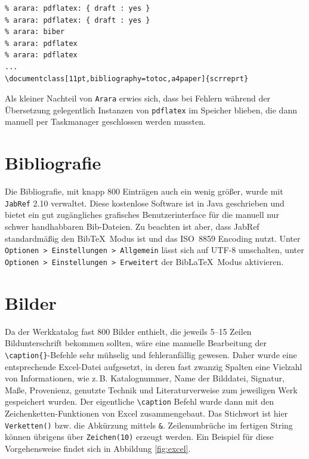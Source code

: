 \documentclass[12pt,ngerman]{dtk}
\begin{document}
\begin{lstlisting}[caption={Arara-Kopf für die Steuerung des \LaTeX\ Laufs},label={lis:arara}]
%!TEX TS-program = Arara
% arara: pdflatex: { draft : yes }
% arara: pdflatex: { draft : yes }
% arara: biber
% arara: pdflatex
% arara: pdflatex
...
\documentclass[11pt,bibliography=totoc,a4paper]{scrreprt}
\end{lstlisting}

Als kleiner Nachteil von \texttt{Arara} erwies sich, dass bei Fehlern während der Übersetzung gelegentlich Instanzen von \texttt{pdflatex} im Speicher blieben, die dann manuell per Taskmanager geschlossen werden mussten.

\section{Bibliografie}

Die Bibliografie, mit knapp 800 Einträgen auch ein wenig größer, wurde mit \texttt{JabRef} 2.10 verwaltet. Diese kostenlose Software ist in Java geschrieben und bietet ein gut zugängliches grafisches Benutzerinterface für die manuell nur schwer handhabbaren Bib-Dateien. Zu beachten ist aber, dass JabRef standardmäßig den Bib\TeX\  Modus ist und das ISO~8859 Encoding nutzt. Unter \texttt{Optionen > Einstellungen > Allgemein} lässt sich auf UTF-8 umschalten, unter \texttt{Optionen > Einstellungen > Erweitert} der Bib\LaTeX\ Modus aktivieren. 


\section{Bilder}

Da der Werkkatalog fast 800 Bilder enthielt, die jeweils 5--15 Zeilen Bildunterschrift bekommen sollten, wäre eine manuelle Bearbeitung der \verb|\caption{}|-Befehle  sehr mühselig und fehleranfällig gewesen. Daher wurde eine entsprechende Excel-Datei aufgesetzt, in deren fast zwanzig Spalten eine Vielzahl von Informationen, wie z.\,B. Katalognummer, Name der Bilddatei, Signatur, Maße, Provenienz, genutzte Technik und Literaturverweise zum jeweiligen Werk gespeichert wurden. Der eigentliche \verb|\caption| Befehl wurde dann mit den Zeichenketten-Funktionen von Excel zusammengebaut. Das Stichwort ist hier \texttt{Verketten()} bzw. die Abkürzung mittels \texttt{\&}. Zeilenumbrüche im fertigen String können übrigens über \texttt{Zeichen(10)} erzeugt werden. Ein Beispiel für diese Vorgehensweise findet sich in Abbildung \ref{fig:excel}. 
\end{document}
